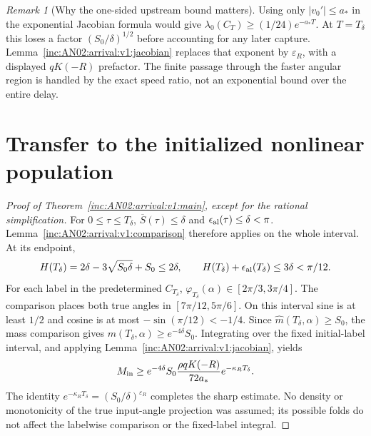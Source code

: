 \documentclass[11pt]{article}
\numberwithin{equation}{section}
\theoremstyle{remark}
\newtheorem{remark}[theorem]{Remark}
\begin{document}
\begin{remark}[Why the one-sided upstream bound matters]
Using only $|v_0'|\le a_*$ in the exponential Jacobian formula would give
$\lambda_0(C_T)\ge(1/24)e^{-a_*T}$. At $T=T_\delta$ this loses a factor
$(S_0/\delta)^{1/2}$ before accounting for any later capture.
Lemma~\ref{inc:AN02:arrival:v1:jacobian} replaces that exponent by
$\varepsilon_R$, with a displayed $qK(-R)$ prefactor. The finite passage
through the faster angular region is handled by the exact speed ratio,
not an exponential bound over the entire delay.
\end{remark}

\section{Transfer to the initialized nonlinear population}
\label{inc:AN02:arrival:v1:transfer}

\begin{proof}[Proof of Theorem~\ref{inc:AN02:arrival:v1:main}, except for the rational simplification]
For $0\le\tau\le T_\delta$, $\overline S(\tau)\le\delta$ and
$\epsilon_{\rm al}(\tau)\le\delta<\pi$.
Lemma~\ref{inc:AN02:arrival:v1:comparison} therefore applies on the
whole interval. At its endpoint,
\[
 H(T_\delta)=2\delta-3\sqrt{S_0\delta}+S_0\le2\delta,
 \qquad H(T_\delta)+\epsilon_{\rm al}(T_\delta)\le3\delta<\pi/12.
\]
For each label in the predetermined $C_{T_\delta}$,
$\varphi_{T_\delta}(\alpha)\in[2\pi/3,3\pi/4]$.
The comparison places both true angles in
$[7\pi/12,5\pi/6]$. On this interval sine is at least $1/2$ and cosine
is at most $-\sin(\pi/12)<-1/4$. Since
$\widehat m(T_\delta,\alpha)\ge S_0$, the mass comparison gives
$m(T_\delta,\alpha)\ge e^{-4\delta}S_0$.
Integrating over the fixed initial-label interval, and applying
Lemma~\ref{inc:AN02:arrival:v1:jacobian}, yields
\[
 M_{\rm in}\ge e^{-4\delta}S_0
       \frac{\rho qK(-R)}{72a_*}e^{-\kappa_R T_\delta}.
\]
The identity
$e^{-\kappa_R T_\delta}=(S_0/\delta)^{\varepsilon_R}$ completes the
sharp estimate. No density or monotonicity of the true input-angle
projection was assumed; its possible folds do not affect the labelwise
comparison or the fixed-label integral.
\end{proof}
\end{document}
